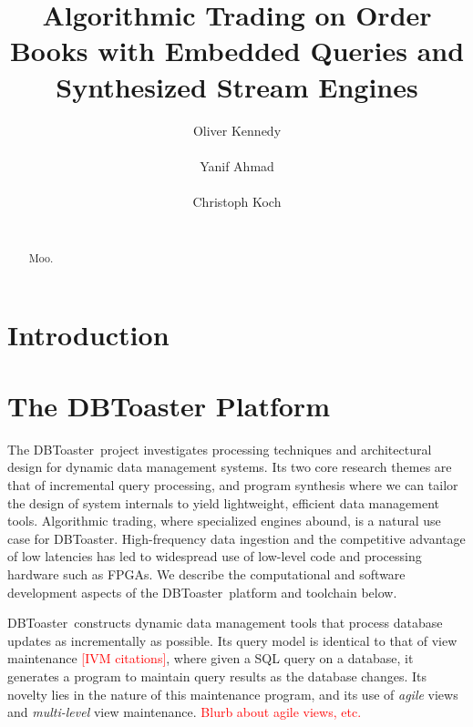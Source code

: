 \documentclass{vldb}
\newcommand{\tinysection}[1]{\noindent{\bf #1.}}
\newcommand{\todo}[1]{\textcolor{red}{#1}}
\newcommand{\compiler}{DBToaster}
\begin{document}
\title{Algorithmic Trading on Order Books with Embedded Queries and Synthesized
Stream Engines}
\author{
\alignauthor
Oliver Kennedy\\
\\
\alignauthor
Yanif Ahmad\\
\\
\alignauthor
Christoph Koch\\
\\
}
\maketitle

\begin{abstract}
Moo.
\end{abstract}

\section{Introduction}




\section{The DBToaster Platform}

The \compiler\ project investigates processing techniques and architectural
design for dynamic data management systems. Its two core research themes are
that of incremental query processing, and program synthesis where we can tailor
the design of system internals to yield lightweight, efficient data management
tools. Algorithmic trading, where specialized engines abound, is a natural use
case for \compiler. High-frequency data ingestion and the competitive advantage
of low latencies has led to widespread use of low-level code and
processing hardware such as FPGAs. We describe the computational and software
development aspects of the \compiler\ platform and toolchain below.

\tinysection{Dynamic Data Management}
\compiler\ constructs dynamic data management tools that process database
updates as incrementally as possible. Its query model is identical to that of
view maintenance \todo{[IVM citations]}, where given a SQL query on a database,
it generates a program to maintain query results as the database changes. Its
novelty lies in the nature of this maintenance program, and its use of
\textit{agile} views and \textit{multi-level} view maintenance.
\todo{Blurb about agile views, etc.}
\end{document}
